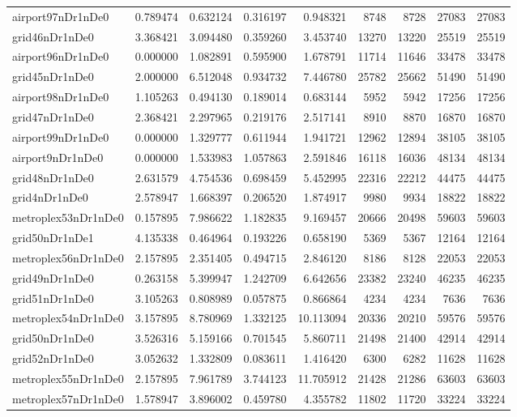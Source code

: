 \begin{longtable}{|l|r|r|r|r|r|r|r|r|}
airport97nDr1nDe0 & 0.789474 & 0.632124 & 0.316197 & 0.948321 & 8748 & 8728 & 27083 & 27083 \\
grid46nDr1nDe0 & 3.368421 & 3.094480 & 0.359260 & 3.453740 & 13270 & 13220 & 25519 & 25519 \\
airport96nDr1nDe0 & 0.000000 & 1.082891 & 0.595900 & 1.678791 & 11714 & 11646 & 33478 & 33478 \\
grid45nDr1nDe0 & 2.000000 & 6.512048 & 0.934732 & 7.446780 & 25782 & 25662 & 51490 & 51490 \\
airport98nDr1nDe0 & 1.105263 & 0.494130 & 0.189014 & 0.683144 & 5952 & 5942 & 17256 & 17256 \\
grid47nDr1nDe0 & 2.368421 & 2.297965 & 0.219176 & 2.517141 & 8910 & 8870 & 16870 & 16870 \\
airport99nDr1nDe0 & 0.000000 & 1.329777 & 0.611944 & 1.941721 & 12962 & 12894 & 38105 & 38105 \\
airport9nDr1nDe0 & 0.000000 & 1.533983 & 1.057863 & 2.591846 & 16118 & 16036 & 48134 & 48134 \\
grid48nDr1nDe0 & 2.631579 & 4.754536 & 0.698459 & 5.452995 & 22316 & 22212 & 44475 & 44475 \\
grid4nDr1nDe0 & 2.578947 & 1.668397 & 0.206520 & 1.874917 & 9980 & 9934 & 18822 & 18822 \\
metroplex53nDr1nDe0 & 0.157895 & 7.986622 & 1.182835 & 9.169457 & 20666 & 20498 & 59603 & 59603 \\
grid50nDr1nDe1 & 4.135338 & 0.464964 & 0.193226 & 0.658190 & 5369 & 5367 & 12164 & 12164 \\
metroplex56nDr1nDe0 & 2.157895 & 2.351405 & 0.494715 & 2.846120 & 8186 & 8128 & 22053 & 22053 \\
grid49nDr1nDe0 & 0.263158 & 5.399947 & 1.242709 & 6.642656 & 23382 & 23240 & 46235 & 46235 \\
grid51nDr1nDe0 & 3.105263 & 0.808989 & 0.057875 & 0.866864 & 4234 & 4234 & 7636 & 7636 \\
metroplex54nDr1nDe0 & 3.157895 & 8.780969 & 1.332125 & 10.113094 & 20336 & 20210 & 59576 & 59576 \\
grid50nDr1nDe0 & 3.526316 & 5.159166 & 0.701545 & 5.860711 & 21498 & 21400 & 42914 & 42914 \\
grid52nDr1nDe0 & 3.052632 & 1.332809 & 0.083611 & 1.416420 & 6300 & 6282 & 11628 & 11628 \\
metroplex55nDr1nDe0 & 2.157895 & 7.961789 & 3.744123 & 11.705912 & 21428 & 21286 & 63603 & 63603 \\
metroplex57nDr1nDe0 & 1.578947 & 3.896002 & 0.459780 & 4.355782 & 11802 & 11720 & 33224 & 33224 \\

\end{longtable}
